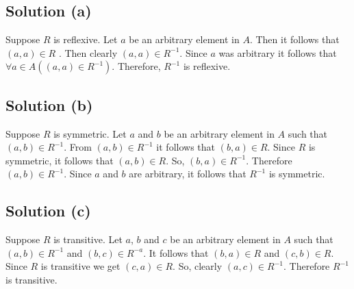 \documentclass{article}
\begin{document}
\subsection{Solution (a)}
Suppose $R$ is reflexive. Let $a$ be an arbitrary element in $A$. Then
it follows that $(a,a) \in R$ . Then clearly $(a,a) \in R^{-1}$. Since
$a$ was arbitrary it follows that $\forall a \in A((a,a) \in R^{-1})$.
Therefore, $R^{-1}$ is reflexive.

\subsection{Solution (b)}
Suppose $R$ is symmetric. Let $a$ and $b$ be an arbitrary element in
$A$ such that $(a,b) \in R^{-1}$. From $(a,b) \in R^{-1}$ it follows
that $(b,a) \in R$. Since $R$ is symmetric, it follows that $(a,b) \in
R$. So, $(b,a) \in R^{-1}$. Therefore $(a,b) \in R^{-1}$. Since $a$
and $b$ are arbitrary, it follows that $R^{-1}$ is symmetric.

\subsection{Solution (c)}
Suppose $R$ is transitive. Let $a$, $b$ and $c$ be an arbitrary
element in $A$ such that $(a,b) \in R^{-1}$ and $(b,c) \in R^{-a}$. It
follows that $(b,a) \in R$ and $(c,b) \in R$. Since $R$ is transitive
we get $(c,a) \in R$. So, clearly $(a,c) \in R^{-1}$. Therefore
$R^{-1}$ is transitive.
\end{document}

